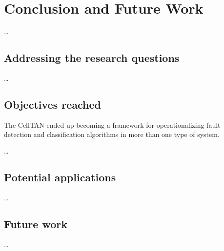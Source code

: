 \chapter{Conclusion and Future Work} \label{chap:concl}

\dots


\section{Addressing the research questions}
\dots

\section{Objectives reached}

The CellTAN ended up becoming a framework for operationalizing fault detection and classification algorithms in more than one type of system. 

\dots

\section{Potential applications}
\dots


\section{Future work}


\dots
